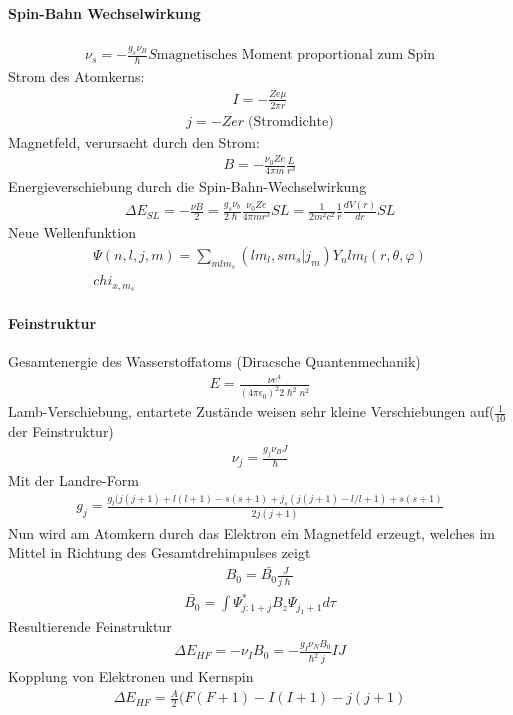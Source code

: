 \documentclass[10pt,a4paper]{article}
\begin{document}
\paragraph{Spin-Bahn Wechselwirkung}$\,$ \\
\begin{align}
\nu_s=-\frac{g_s \nu_B}{\hslash}S \text{magnetisches Moment proportional zum Spin}
\end{align}
Strom des Atomkerns:
\begin{align}
I=-\frac{Z e \mu}{2 \pi r}
\end{align}
\begin{align}
j=-Zer \; \text{(Stromdichte)}
\end{align}
Magnetfeld, verursacht durch den Strom:
\begin{align}
B=-\frac{\nu_0 Ze}{4 \pi m} \frac{L}{r^3}
\end{align}
Energieverschiebung durch die Spin-Bahn-Wechselwirkung
\begin{align}
\Delta E_{SL}=-\frac{\nu B}{2}=\frac{g_s \nu_b}{2 \hslash} \frac{\nu_0 Ze}{4 \pi m r^3} SL= \frac{1}{2m^2c^2} \frac{1}{r} \frac{dV(r)}{dr} SL
\end{align}
Neue Wellenfunktion
\begin{align}
\Psi(n,l,j,m)=\sum_{mlm_s}(lm_l,sm_s \vert j_m) Y_nlm_l (r,\theta, \varphi) \\chi_{x,m_s}
\end{align}
\paragraph{Feinstruktur}$\,$ \\
Gesamtenergie des Wasserstoffatoms (Diracsche Quantenmechanik)
\begin{align}
E=\frac{\nu e^4}{(4 \pi \epsilon_0)^2 2 \hslash^2 n^2}
\end{align}
Lamb-Verschiebung, entartete Zustände weisen sehr kleine Verschiebungen auf($\frac{1}{10}$ der Feinstruktur)
\begin{align}
\nu_j=\frac{g_j \nu_B J}{\hslash}
\end{align}
Mit der Landre-Form
\begin{align}
g_j=\frac{g_l(j(j+1)+l(l+1)-s(s+1)+j_s (j(j+1)-l/l+1)+s(s+1)}{2j(j+1)}
\end{align}
Nun wird am Atomkern durch das Elektron ein Magnetfeld erzeugt, welches im Mittel in Richtung des Gesamtdrehimpulses zeigt
\begin{align}
B_0=\bar{B_0} \frac{J}{j \hslash}
\end{align}
\begin{align}
\bar{B_0}=\int \Psi_{j:1+j}^* B_z \Psi_{j_1+1} d\tau
\end{align}
Resultierende Feinstruktur
\begin{align}
\Delta E_{HF}=-\nu_I B_0=-\frac{g_I \nu_N B_0}{\hslash^2 j}IJ
\end{align}
Kopplung von Elektronen und Kernspin
\begin{align}
\Delta E_{HF}= \frac{A}{2}(F(F+1)-I(I+1)-j(j+1)
\end{align}
\end{document}
